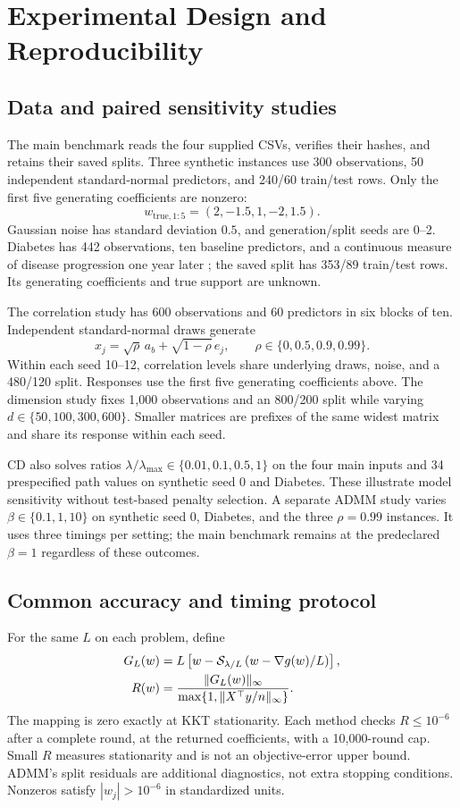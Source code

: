 \documentclass[10pt,letterpaper]{article}
\begin{document}
\section{Experimental Design and Reproducibility}
\subsection{Data and paired sensitivity studies}
The main benchmark reads the four supplied CSVs, verifies their hashes, and retains their saved splits. Three synthetic instances use 300 observations, 50 independent standard-normal predictors, and 240/60 train/test rows. Only the first five generating coefficients are nonzero:
\[w_{\mathrm{true},1:5}=(2,-1.5,1,-2,1.5).\]
Gaussian noise has standard deviation $0.5$, and generation/split seeds are 0--2. Diabetes has 442 observations, ten baseline predictors, and a continuous measure of disease progression one year later \citep{efron2004,sklearn_data}; the saved split has 353/89 train/test rows. Its generating coefficients and true support are unknown.

The correlation study has 600 observations and 60 predictors in six blocks of ten. Independent standard-normal draws generate
\begin{equation}
 x_j=\sqrt{\rho}\,a_b+\sqrt{1-\rho}\,e_j,
 \qquad\rho\in\{0,0.5,0.9,0.99\}.
\end{equation}
Within each seed 10--12, correlation levels share underlying draws, noise, and a 480/120 split. Responses use the first five generating coefficients above. The dimension study fixes 1,000 observations and an 800/200 split while varying $d\in\{50,100,300,600\}$. Smaller matrices are prefixes of the same widest matrix and share its response within each seed.

CD also solves ratios $\lambda/\lambda_{\max}\in\{0.01,0.1,0.5,1\}$ on the four main inputs and 34 prespecified path values on synthetic seed 0 and Diabetes. These illustrate model sensitivity without test-based penalty selection. A separate ADMM study varies $\beta\in\{0.1,1,10\}$ on synthetic seed 0, Diabetes, and the three $\rho=0.99$ instances. It uses three timings per setting; the main benchmark remains at the predeclared $\beta=1$ regardless of these outcomes.

\subsection{Common accuracy and timing protocol}
For the same $L$ on each problem, define
\begin{align}
 G_L(w)&=L\left[w-\mathcal{S}_{\lambda/L}\left(w-\nabla g(w)/L\right)\right],\\
 R(w)&=\frac{\|G_L(w)\|_\infty}{\max\{1,\|X^\top y/n\|_\infty\}}.
 \label{eq:residual}
\end{align}
The mapping is zero exactly at KKT stationarity. Each method checks $R\leq10^{-6}$ after a complete round, at the returned coefficients, with a 10,000-round cap. Small $R$ measures stationarity and is not an objective-error upper bound. ADMM's split residuals are additional diagnostics, not extra stopping conditions. Nonzeros satisfy $|w_j|>10^{-6}$ in standardized units.
\end{document}
